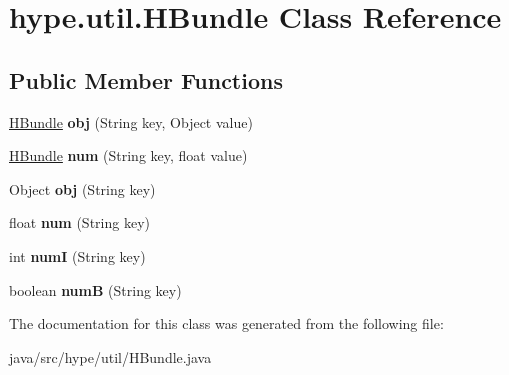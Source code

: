 \hypertarget{classhype_1_1util_1_1_h_bundle}{\section{hype.\-util.\-H\-Bundle Class Reference}
\label{classhype_1_1util_1_1_h_bundle}
}
\subsection*{Public Member Functions}
\begin{DoxyCompactItemize}
\item 
\hypertarget{classhype_1_1util_1_1_h_bundle_a98c6756d068540847ecbd27cd516fed7}{\hyperlink{classhype_1_1util_1_1_h_bundle}{H\-Bundle} {\bfseries obj} (String key, Object value)}\label{classhype_1_1util_1_1_h_bundle_a98c6756d068540847ecbd27cd516fed7}

\item 
\hypertarget{classhype_1_1util_1_1_h_bundle_a0dfbb17eba2677cae1caaed013b36ea6}{\hyperlink{classhype_1_1util_1_1_h_bundle}{H\-Bundle} {\bfseries num} (String key, float value)}\label{classhype_1_1util_1_1_h_bundle_a0dfbb17eba2677cae1caaed013b36ea6}

\item 
\hypertarget{classhype_1_1util_1_1_h_bundle_a188e58353d1b8804dffb24d9d9d1c13c}{Object {\bfseries obj} (String key)}\label{classhype_1_1util_1_1_h_bundle_a188e58353d1b8804dffb24d9d9d1c13c}

\item 
\hypertarget{classhype_1_1util_1_1_h_bundle_abc6fde0b241eb0bf81a19b1706c40d89}{float {\bfseries num} (String key)}\label{classhype_1_1util_1_1_h_bundle_abc6fde0b241eb0bf81a19b1706c40d89}

\item 
\hypertarget{classhype_1_1util_1_1_h_bundle_a0a9d3c38b42599b343222eff9d567388}{int {\bfseries num\-I} (String key)}\label{classhype_1_1util_1_1_h_bundle_a0a9d3c38b42599b343222eff9d567388}

\item 
\hypertarget{classhype_1_1util_1_1_h_bundle_a07f00870938b5c30eb36bc7e8f8c2f17}{boolean {\bfseries num\-B} (String key)}\label{classhype_1_1util_1_1_h_bundle_a07f00870938b5c30eb36bc7e8f8c2f17}

\end{DoxyCompactItemize}


The documentation for this class was generated from the following file\-:\begin{DoxyCompactItemize}
\item 
java/src/hype/util/H\-Bundle.\-java\end{DoxyCompactItemize}
